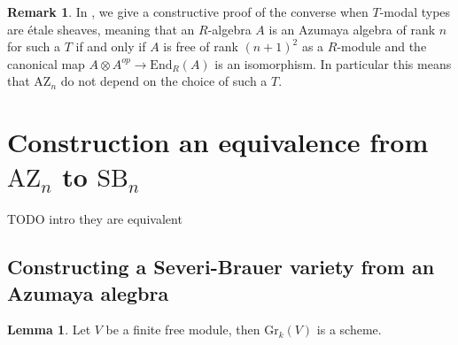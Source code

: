 \documentclass[10pt,a4paper]{article}
\theoremstyle{definition}
\newtheorem{lemma}[theorem]{Lemma}
\newtheorem{remark}[theorem]{Remark}
\newcommand{\Gr}{\mathrm{Gr}}
\newcommand{\SB}{\mathrm{SB}}
\newcommand{\AZ}{\mathrm{AZ}}
\newcommand{\propTrunc}[1]{\lVert #1 \rVert}
\begin{document}
\begin{remark}\label{azumaya-independent-modality}
In \cite{coqazumaya}, we give a constructive proof of the converse when $T$-modal types are étale sheaves, meaning that an $R$-algebra $A$ is an Azumaya algebra of rank $n$ for such a $T$ if and only if $A$ is free of rank $(n+1)^2$ as a $R$-module and the canonical map $A\otimes A^{op}\rightarrow \mathrm{End}_R(A)$ is an isomorphism. In particular this means that $\AZ_n$ do not depend on the choice of such a $T$.
\end{remark}




\section{Construction an equivalence from $\AZ_n$ to $\SB_n$}

TODO intro they are equivalent


\subsection{Constructing a Severi-Brauer variety from an Azumaya alegbra}

\begin{lemma}\label{grassmanians-are-schemes}
Let $V$ be a finite free module, then $\Gr_k(V)$ is a scheme.
\end{lemma}
\end{document}
